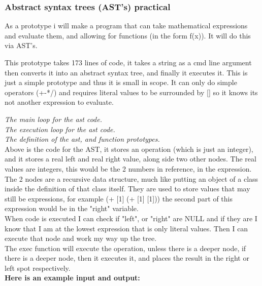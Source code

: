 \documentclass[a4paper,12pt]{article}
\begin{document}
{\subsubsection{Abstract syntax trees (AST's) practical}
As a prototype i will make a program that can take mathematical expressions and evaluate 
them, and allowing for functions (in the form f(x)). It will do this via AST's.

This prototype takes 173 lines of code, it takes a string as a cmd line argument then 
converts it into an abstract syntax tree, and finally it executes it. This is just a
simple prototype and thus it is small in scope. It can only do simple operators (+-*/) 
and requires literal values to be surrounded by [] so it knows its not another 
expression to evaluate.


\textit{The main loop for the ast code.}
\\


\textit{The execution loop for the ast code.}
\\


\textit{The definition of the ast, and function prototypes.}
\\

Above is the code for the AST, it stores an operation (which is just an integer), and 
it stores a real left and real right value, along side two other nodes. The real values
are integers, this would be the 2 numbers in reference, in the expression. The 2 nodes are a
recursive data structure, much like putting an object of a class inside the definition of that class
itself. They are used to store values that may still be expressions, for example 
(+ [1] (+ [1] [1])) the second part of this expression would be in the "right" 
variable. 
\\

When code is executed I can check if "left", or "right" are NULL and if 
they are I know that I am at the lowest expression that is only literal values.
Then I can execute that node and work my way up the tree.
\\

The exec function will execute the operation, unless there is a deeper node, if there is 
a deeper node, then it executes it, and places the result in the right or left spot 
respectively.
\\

\textbf{Here is an example input and output:}

}
\end{document}
